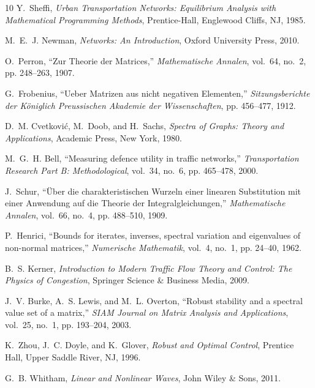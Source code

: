 \documentclass[lettersize,journal]{IEEEtran}
\begin{document}
\begin{thebibliography}{10}
Y.~Sheffi, \emph{Urban Transportation Networks: Equilibrium Analysis with Mathematical Programming Methods}, Prentice-Hall, Englewood Cliffs, NJ, 1985.

M.~E.~J. Newman, \emph{Networks: An Introduction}, Oxford University Press, 2010.

O.~Perron, ``Zur Theorie der Matrices,'' \emph{Mathematische Annalen}, vol.~64, no.~2, pp. 248--263, 1907.

G.~Frobenius, ``Ueber Matrizen aus nicht negativen Elementen,'' \emph{Sitzungsberichte der K{\"o}niglich Preussischen Akademie der Wissenschaften}, pp. 456--477, 1912.

D.~M. Cvetkovi{\'c}, M.~Doob, and H.~Sachs, \emph{Spectra of Graphs: Theory and Applications}, Academic Press, New York, 1980.

M.~G.~H. Bell, ``Measuring defence utility in traffic networks,'' \emph{Transportation Research Part B: Methodological}, vol.~34, no.~6, pp. 465--478, 2000.

J.~Schur, ``{\"U}ber die charakteristischen Wurzeln einer linearen Substitution mit einer Anwendung auf die Theorie der Integralgleichungen,'' \emph{Mathematische Annalen}, vol.~66, no.~4, pp. 488--510, 1909.

P.~Henrici, ``Bounds for iterates, inverses, spectral variation and eigenvalues of non-normal matrices,'' \emph{Numerische Mathematik}, vol.~4, no.~1, pp. 24--40, 1962.

B.~S. Kerner, \emph{Introduction to Modern Traffic Flow Theory and Control: The Physics of Congestion}, Springer Science \& Business Media, 2009.

J.~V. Burke, A.~S. Lewis, and M.~L. Overton, ``Robust stability and a spectral value set of a matrix,'' \emph{SIAM Journal on Matrix Analysis and Applications}, vol.~25, no.~1, pp. 193--204, 2003.

K.~Zhou, J.~C. Doyle, and K.~Glover, \emph{Robust and Optimal Control}, Prentice Hall, Upper Saddle River, NJ, 1996.

G.~B. Whitham, \emph{Linear and Nonlinear Waves}, John Wiley \& Sons, 2011.

\end{thebibliography}
\end{document}

